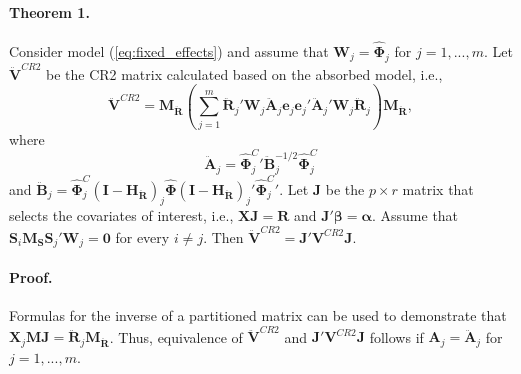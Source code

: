 \documentclass[12pt]{article}\usepackage[]{graphicx}\usepackage[]{color}
\newcommand{\bm}{\mathbf}
\newcommand{\bs}{\boldsymbol}
\begin{document}
\paragraph{Theorem 1.} Consider model (\ref{eq:fixed_effects}) and assume that $\bm{W}_j = \bs{\hat\Phi}_j$ for $j = 1,...,m$. Let $\bm{\ddot{V}}^{CR2}$ be the CR2 matrix calculated based on the absorbed model, i.e., 
\[
\bm{\ddot{V}}^{CR2} = \bm{M_{\ddot{R}}}\left(\sum_{j=1}^m \bm{\ddot{R}}_j'\bm{W}_j \bm{\ddot{A}}_j \bm{e}_j \bm{e}_j' \bm{\ddot{A}}_j' \bm{W}_j \bm{\ddot{R}}_j\right) \bm{M_{\ddot{R}}},
\]
where \[
\bm{\ddot{A}}_j = {\bs{\hat\Phi}_j^C}' \bm{\ddot{B}}_j^{-1/2}\hat{\bs\Phi}_j^C \]
and $\bm{\ddot{B}}_j = \hat{\bs\Phi}_j^C\left(\bm{I} - \bm{H_{\ddot{R}}}\right)_j \hat{\bs\Phi} \left(\bm{I} - \bm{H_{\ddot{R}}}\right)_j' {\bs{\hat\Phi}_j^C}'$.
Let $\bm{J}$ be the $p \times r$ matrix that selects the covariates of interest, i.e., $\bm{X}\bm{J} = \bm{R}$ and $\bm{J}'\bs\beta = \bs\alpha$. 
Assume that $\bm{S}_i \bm{M_S}\bm{S}_j'\bm{W}_j = \bm{0}$ for every $i \neq j$. Then $\bm{\ddot{V}}^{CR2} = \bm{J}'\bm{V}^{CR2}\bm{J}$.

\paragraph{Proof.} Formulas for the inverse of a partitioned matrix can be used to demonstrate that $\bm{X}_j\bm{M}\bm{J} = \bm{\ddot{R}}_j \bm{M_{\ddot{R}}}$. Thus, equivalence of $\bm{\ddot{V}}^{CR2}$ and $\bm{J}'\bm{V}^{CR2}\bm{J}$ follows if $\bm{A}_j = \bm{\ddot{A}}_j$ for $j = 1,...,m$.
\end{document}

